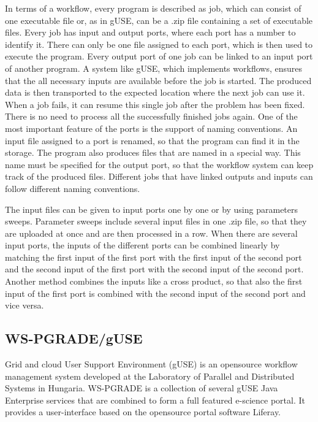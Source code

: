 In terms of a workflow, every program is described as job, which can consist of one executable file or, as in gUSE, can be a .zip file containing a set of executable files.
Every job has input and output ports, where each port has a number to identify it.
There can only be one file assigned to each port, which is then used to execute the program.
Every output port of one job can be linked to an input port of another program.
A system like gUSE, which implements workflows, ensures that the all necessary inputs are available before the job is started.
The produced data is then transported to the expected location where the next job can use it.
When a job fails, it can resume this single job after the problem has been fixed.
There is no need to process all the successfully finished jobs again.
One of the most important feature of the ports is the support of naming conventions.
An input file assigned to a port is renamed, so that the program can find it in the storage.
The program also produces files that are named in a special way.
This name must be specified for the output port, so that the workflow system can keep track of the produced files.
Different jobs that have linked outputs and inputs can follow different naming conventions.

The input files can be given to input ports one by one or by using parameters sweeps.
Parameter sweeps include several input files in one .zip file, so that they are uploaded at once and are then processed in a row.
When there are several input ports, the inputs of the different ports can be combined linearly by matching the first input of the first port with the first input of the second port and the second input of the first port with the second input of the second port.
Another method combines the inputs like a cross product, so that also the first input of the first port is combined with the second input of the second port and vice versa.

\subsection{WS-PGRADE/gUSE}\label{guse}

Grid and cloud User Support Environment (gUSE) is an opensource workflow management system developed at the Laboratory of Parallel and Distributed Systems in Hungaria.
WS-PGRADE is a collection of several gUSE Java Enterprise services that are combined to form a full featured e-science portal.
It provides a user-interface based on the opensource portal software Liferay.


